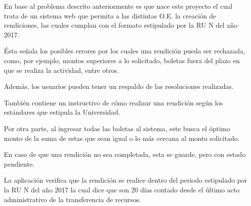 En base al problema descrito anteriormente es que nace este proyecto el cual trata de un sistema web que permita a las distintas O.E. la creación de rendiciones, las cuales cumplan con el formato estipulado por la RU N del año 2017.

Ésta señala los posibles errores por los cuales una rendición pueda ser rechazada, como, por ejemplo, montos superiores a lo solicitado, boletas fuera del plazo en que se realiza la actividad, entre otros.

Además, los usuarios pueden tener un respaldo de las resoluciones realizadas.

También contiene un instructivo de cómo realizar una rendición según los estándares que estipula la Universidad.   

Por otra parte, al ingresar todas las boletas al sistema, este busca el óptimo monto de la suma de estas que sean igual o lo más cercana al monto solicitado.

En caso de que una rendición no sea completada, esta se guarde, pero con estado pendiente.

La aplicación verifica que la rendición se realice dentro del periodo estipulado por la RU N del año 2017 la cual dice que son 20 días contado desde el último acto administrativo de la transferencia de recursos.
